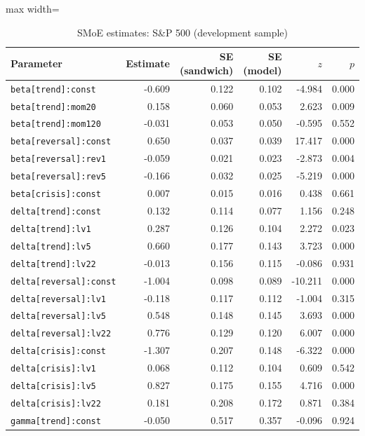 \begin{table}[!htbp]\centering\scriptsize
\caption{SMoE estimates: S\&P 500 (development sample)}\label{tab:params_spx}
\begin{adjustbox}{max width=\textwidth}
\begin{tabular}{lrrrrr}
\toprule
Parameter & Estimate & SE (sandwich) & SE (model) & $z$ & $p$\\
\midrule
\texttt{beta[trend]:const} & -0.609 & 0.122 & 0.102 & -4.984 & 0.000\\
\texttt{beta[trend]:mom20} & 0.158 & 0.060 & 0.053 & 2.623 & 0.009\\
\texttt{beta[trend]:mom120} & -0.031 & 0.053 & 0.050 & -0.595 & 0.552\\
\texttt{beta[reversal]:const} & 0.650 & 0.037 & 0.039 & 17.417 & 0.000\\
\texttt{beta[reversal]:rev1} & -0.059 & 0.021 & 0.023 & -2.873 & 0.004\\
\texttt{beta[reversal]:rev5} & -0.166 & 0.032 & 0.025 & -5.219 & 0.000\\
\texttt{beta[crisis]:const} & 0.007 & 0.015 & 0.016 & 0.438 & 0.661\\
\texttt{delta[trend]:const} & 0.132 & 0.114 & 0.077 & 1.156 & 0.248\\
\texttt{delta[trend]:lv1} & 0.287 & 0.126 & 0.104 & 2.272 & 0.023\\
\texttt{delta[trend]:lv5} & 0.660 & 0.177 & 0.143 & 3.723 & 0.000\\
\texttt{delta[trend]:lv22} & -0.013 & 0.156 & 0.115 & -0.086 & 0.931\\
\texttt{delta[reversal]:const} & -1.004 & 0.098 & 0.089 & -10.211 & 0.000\\
\texttt{delta[reversal]:lv1} & -0.118 & 0.117 & 0.112 & -1.004 & 0.315\\
\texttt{delta[reversal]:lv5} & 0.548 & 0.148 & 0.145 & 3.693 & 0.000\\
\texttt{delta[reversal]:lv22} & 0.776 & 0.129 & 0.120 & 6.007 & 0.000\\
\texttt{delta[crisis]:const} & -1.307 & 0.207 & 0.148 & -6.322 & 0.000\\
\texttt{delta[crisis]:lv1} & 0.068 & 0.112 & 0.104 & 0.609 & 0.542\\
\texttt{delta[crisis]:lv5} & 0.827 & 0.175 & 0.155 & 4.716 & 0.000\\
\texttt{delta[crisis]:lv22} & 0.181 & 0.208 & 0.172 & 0.871 & 0.384\\
\texttt{gamma[trend]:const} & -0.050 & 0.517 & 0.357 & -0.096 & 0.924\\

\end{tabular}
\end{adjustbox}
\end{table}
